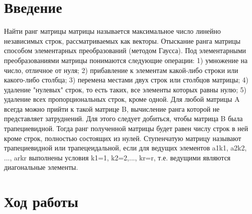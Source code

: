 \documentclass[12pt,a4paper]{scrartcl}
\begin{document}
	\section{Введение}
\label{sec:intro}
Найти ранг матрицы
 матрицы называется максимальное число линейно независимых строк, рассматриваемых как векторы.
Отыскание ранга матрицы способом элементарных преобразований (методом Гаусса). Под элементарными преобразованиями матрицы понимаются следующие операции: 1) умножение на число, отличное от нуля; 2) прибавление к элементам какой-либо строки или какого-либо столбца; 3) перемена местами двух строк или столбцов матрицы; 4) удаление "нулевых" строк, то есть таких, все элементы которых равны нулю; 5) удаление всех пропорциональных строк, кроме одной.
Для любой матрицы A всегда можно прийти к такой матрице B, вычисление ранга которой не представляет затруднений. Для этого следует добиться, чтобы матрица B была трапециевидной. Тогда ранг полученной матрицы будет равен числу строк в ней кроме строк, полностью состоящих из нулей.
Ступенчатую матрицу называют трапециевидной или трапецеидальной, если для ведущих элементов a1k1, a2k2, ..., arkr выполнены условия k1=1, k2=2,..., kr=r, т.е. ведущими являются диагональные элементы.\\




\section{Ход работы}
\label{sec:exp:code}
\end{document}
